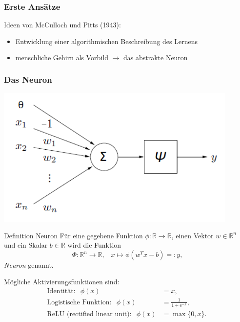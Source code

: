 \documentclass[10pt]{beamer} %
\newcommand{\RR}{\ensuremath{\mathbb{R}}}
\newcommand{\Rnv}{\ensuremath{\mathbb{R}^{n}}}
\begin{document}
\begin{frame}
  \frametitle{Erste Ansätze}
Ideen von McCulloch und Pitts (1943):
\begin{itemize}
   \item Entwicklung einer algorithmischen Beschreibung des Lernens
   \item menschliche Gehirn als Vorbild $\rightarrow$ das abstrakte Neuron
\end{itemize}
\end{frame}

\begin{frame}
   \frametitle[]{Das Neuron}
   \includegraphics[width=0.9\textwidth]{pics/perzeptron.png}
\end{frame}

\begin{frame}
   \begin{block}{Definition Neuron}
      \label{def_neuron}
      Für eine gegebene Funktion $\phi: \RR \rightarrow \RR$, einen Vektor $w \in \Rnv$ und ein Skalar $b \in \RR$ wird die Funktion 
      \[ \
      \Phi: \RR^n \rightarrow \RR, \; \; \; x \mapsto \phi(w^T x -b)=:y,
      \]
      \textit{Neuron} genannt.
   \end{block}
   \pause
   Mögliche Aktivierungsfunktionen sind:
   \begin{align*}
      \text{Identität}: \; \;\phi(x)&=x, \\
      \text{Logistische Funktion}: \; \;\phi(x)&=\frac{1}{1+\mathrm{e}^{-x}}, \\
      \text{ReLU (rectified linear unit)}: \; \;\phi(x)&=\max\{0,x\}.
  \end{align*}
\end{frame}
\end{document}
